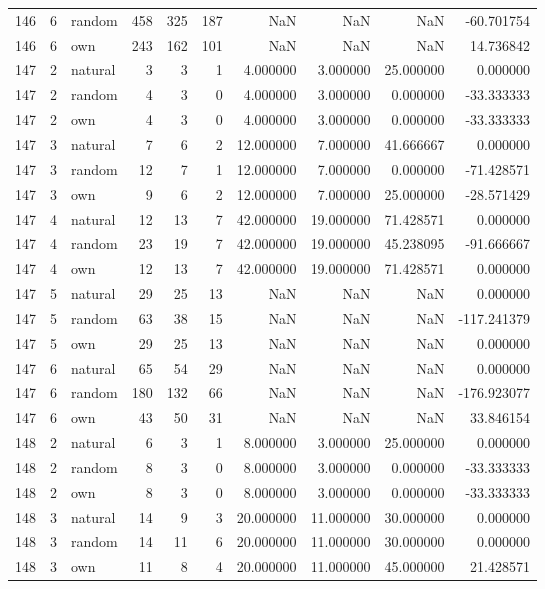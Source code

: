 \begin{table}[htbp]
\begin{tabular}{rrlrrrrrrr}
146 & 6 & random & 458 & 325 & 187 & NaN & NaN & NaN & -60.701754 \\
146 & 6 & own & 243 & 162 & 101 & NaN & NaN & NaN & 14.736842 \\
147 & 2 & natural & 3 & 3 & 1 & 4.000000 & 3.000000 & 25.000000 & 0.000000 \\
147 & 2 & random & 4 & 3 & 0 & 4.000000 & 3.000000 & 0.000000 & -33.333333 \\
147 & 2 & own & 4 & 3 & 0 & 4.000000 & 3.000000 & 0.000000 & -33.333333 \\
147 & 3 & natural & 7 & 6 & 2 & 12.000000 & 7.000000 & 41.666667 & 0.000000 \\
147 & 3 & random & 12 & 7 & 1 & 12.000000 & 7.000000 & 0.000000 & -71.428571 \\
147 & 3 & own & 9 & 6 & 2 & 12.000000 & 7.000000 & 25.000000 & -28.571429 \\
147 & 4 & natural & 12 & 13 & 7 & 42.000000 & 19.000000 & 71.428571 & 0.000000 \\
147 & 4 & random & 23 & 19 & 7 & 42.000000 & 19.000000 & 45.238095 & -91.666667 \\
147 & 4 & own & 12 & 13 & 7 & 42.000000 & 19.000000 & 71.428571 & 0.000000 \\
147 & 5 & natural & 29 & 25 & 13 & NaN & NaN & NaN & 0.000000 \\
147 & 5 & random & 63 & 38 & 15 & NaN & NaN & NaN & -117.241379 \\
147 & 5 & own & 29 & 25 & 13 & NaN & NaN & NaN & 0.000000 \\
147 & 6 & natural & 65 & 54 & 29 & NaN & NaN & NaN & 0.000000 \\
147 & 6 & random & 180 & 132 & 66 & NaN & NaN & NaN & -176.923077 \\
147 & 6 & own & 43 & 50 & 31 & NaN & NaN & NaN & 33.846154 \\
148 & 2 & natural & 6 & 3 & 1 & 8.000000 & 3.000000 & 25.000000 & 0.000000 \\
148 & 2 & random & 8 & 3 & 0 & 8.000000 & 3.000000 & 0.000000 & -33.333333 \\
148 & 2 & own & 8 & 3 & 0 & 8.000000 & 3.000000 & 0.000000 & -33.333333 \\
148 & 3 & natural & 14 & 9 & 3 & 20.000000 & 11.000000 & 30.000000 & 0.000000 \\
148 & 3 & random & 14 & 11 & 6 & 20.000000 & 11.000000 & 30.000000 & 0.000000 \\
148 & 3 & own & 11 & 8 & 4 & 20.000000 & 11.000000 & 45.000000 & 21.428571 \\

\end{tabular}
\end{table}
